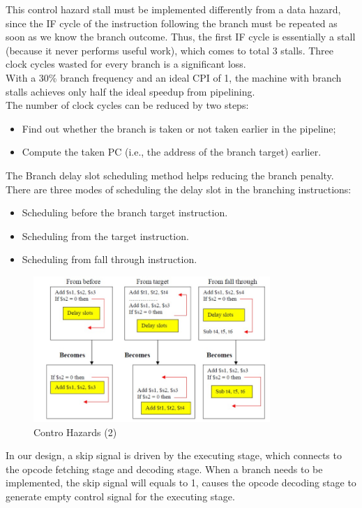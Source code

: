 \documentclass[12pt,a4paper]{report}
\begin{document}
This control hazard stall must be implemented differently from a data hazard, since the IF cycle of the instruction following the branch must be repeated as soon as we know the branch outcome. Thus, the first IF cycle is essentially a stall (because it never performs useful work), which comes to total 3 stalls.
Three clock cycles wasted for every branch is a significant loss.  \\
With a 30\% branch frequency and an ideal CPI of 1, the machine with branch stalls achieves only half the ideal speedup from pipelining.  \\
The number of clock cycles can be reduced by two steps: \\
\begin{itemize}
  \item Find out whether the branch is taken or not taken earlier in the pipeline;
  \item Compute the taken PC (i.e., the address of the branch target) earlier. \\
\end{itemize}
The Branch delay slot scheduling method helps reducing the branch penalty.\\
There are three modes of scheduling the delay slot in the branching instructions: \\
\begin{itemize}
  \item Scheduling before the branch target instruction.
  \item Scheduling from the target instruction.
  \item Scheduling from fall through instruction.
\end{itemize}


\begin{figure}[h]
  \centering
  \includegraphics[width=0.8\textwidth]{CH2}
  \caption{Contro Hazards (2)}
  \label{fig:ch2}
\end{figure}
In our design, a skip signal is driven by the executing stage, which connects to the opcode fetching stage and decoding stage. When a branch needs to be implemented, the skip signal will equals to 1, causes the opcode decoding stage to generate empty control signal for the executing stage.
\end{document}
